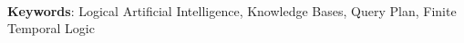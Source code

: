 \documentclass[11pt]{article}
\begin{document}
\begin{abstract}
%
%
%
%
%
%
%
%
%	
\end{abstract}
~\\

{\bf Keywords}: Logical Artificial Intelligence, Knowledge Bases, Query Plan, Finite Temporal Logic
~\\
\end{document}
